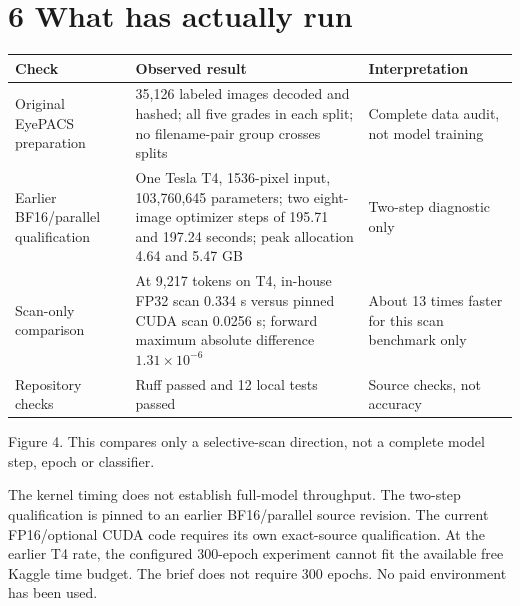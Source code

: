 \documentclass[10pt,a4paper]{article}
\begin{document}
\section*{\color{ink}6 \quad What has actually run}
\small
\begin{tabularx}{\linewidth}{@{}p{.27\linewidth}Y p{.18\linewidth}@{}}
\toprule
Check & Observed result & Interpretation\\
\midrule
Original EyePACS preparation & 35,126 labeled images decoded and hashed;
all five grades in each split; no filename-pair group crosses splits &
Complete data audit, not model training\\
Earlier BF16/parallel qualification & One Tesla T4, 1536-pixel input,
103,760,645 parameters; two eight-image optimizer steps of 195.71 and
197.24 seconds; peak allocation 4.64 and 5.47 GB &
Two-step diagnostic only\\
Scan-only comparison & At 9,217 tokens on T4, in-house FP32 scan 0.334 s
versus pinned CUDA scan 0.0256 s; forward maximum absolute difference
$1.31\times10^{-6}$ &
About 13 times faster for this scan benchmark only\\
Repository checks & Ruff passed and 12 local tests passed &
Source checks, not accuracy\\
\bottomrule
\end{tabularx}
\normalsize

\begin{center}

{\small\color{muted}Figure 4. This compares only a selective-scan direction,
not a complete model step, epoch or classifier.}
\end{center}

The kernel timing does not establish full-model throughput. The two-step
qualification is pinned to an earlier BF16/parallel source revision. The
current FP16/optional CUDA code requires its own exact-source qualification.
At the earlier T4 rate, the configured 300-epoch experiment cannot fit the
available free Kaggle time budget. The brief does not require 300 epochs.
No paid environment has been used.
\end{document}
